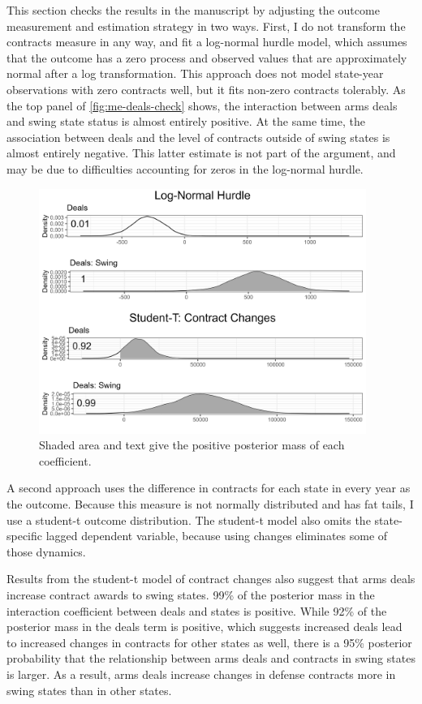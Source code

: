 \documentclass[12pt]{article}
\begin{document}
This section checks the results in the manuscript by adjusting the outcome measurement and estimation strategy in two ways.
First, I do not transform the contracts measure in any way, and fit a log-normal hurdle model, which assumes that the outcome has a zero process and observed values that are approximately normal after a log transformation. 
This approach does not model state-year observations with zero contracts well, but it fits non-zero contracts tolerably. 
As the top panel of \autoref{fig:me-deals-check} shows, the interaction between arms deals and swing state status is almost entirely positive.
At the same time, the association between deals and the level of contracts outside of swing states is almost entirely negative. 
This latter estimate is not part of the argument, and may be due to difficulties accounting for zeros in the log-normal hurdle. 
 

\begin{figure}[htpb]
	\centering
		\includegraphics[width=0.95\textwidth]{me-deals-check.png}
	\caption{Shaded area and text give the positive posterior mass of each coefficient.}
	\label{fig:me-deals-check}
\end{figure}


A second approach uses the difference in contracts for each state in every year as the outcome. 
Because this measure is not normally distributed and has fat tails, I use a student-t outcome distribution.
The student-t model also omits the state-specific lagged dependent variable, because using changes eliminates some of those dynamics. 


Results from the student-t model of contract changes also suggest that arms deals increase contract awards to swing states. 
99\% of the posterior mass in the interaction coefficient between deals and states is positive.
While 92\% of the posterior mass in the deals term is positive, which suggests increased deals lead to increased changes in contracts for other states as well, there is a 95\% posterior probability that the relationship between arms deals and contracts in swing states is larger. 
As a result, arms deals increase changes in defense contracts more in swing states than in other states. 
\end{document}
